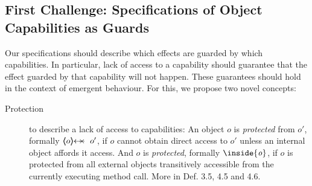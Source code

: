 



\subsection{First Challenge: Specifications of Object Capabilities as Guards}
\label{s:approach:necopers}


Our specifications should describe {which effects are guarded by which capabilities}. 
In particular, lack of access to {a capability  should} guarantee  that {the effect guarded by that capability will not happen.}
  {These guarantees should hold  in the context of   emergent behaviour.}   
For this, we propose two %
{novel concepts}:

 
\begin{description}
\item[Protection] to describe a lack of access to capabilities: An object $o$ is \emph{protected} from $o'$, formally $\protectedFrom {o} {o'}$,  if $o$ cannot obtain direct access to $o'$ unless an internal object affords it access. %
And $o$ is \emph{protected}, formally ${\inside{\prg{\it{o}}}}$, if $o$ is protected from all external objects transitively accessible from the currently executing method call. More in Def. 3.5, 4.5 and 4.6.

\end{description}

